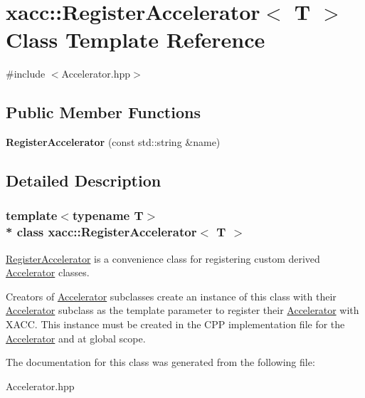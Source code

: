 \hypertarget{a00244}{}\section{xacc\+:\+:Register\+Accelerator$<$ T $>$ Class Template Reference}
\label{a00244}


{\ttfamily \#include $<$Accelerator.\+hpp$>$}

\subsection*{Public Member Functions}
\begin{DoxyCompactItemize}
\item 
{\bfseries Register\+Accelerator} (const std\+::string \&name)\hypertarget{a00244_a329df136d447a887e9794ea078d04706}{}\label{a00244_a329df136d447a887e9794ea078d04706}

\end{DoxyCompactItemize}


\subsection{Detailed Description}
\subsubsection*{template$<$typename T$>$\\*
class xacc\+::\+Register\+Accelerator$<$ T $>$}

\hyperlink{a00244}{Register\+Accelerator} is a convenience class for registering custom derived \hyperlink{a00030}{Accelerator} classes.

Creators of \hyperlink{a00030}{Accelerator} subclasses create an instance of this class with their \hyperlink{a00030}{Accelerator} subclass as the template parameter to register their \hyperlink{a00030}{Accelerator} with X\+A\+CC. This instance must be created in the C\+PP implementation file for the \hyperlink{a00030}{Accelerator} and at global scope. 

The documentation for this class was generated from the following file\+:\begin{DoxyCompactItemize}
\item 
Accelerator.\+hpp\end{DoxyCompactItemize}
